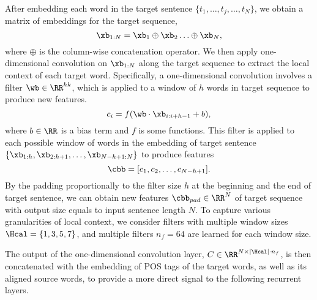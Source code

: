 \documentclass[11pt,a4paper]{article}
\newcommand{\wc}[1]{\textcolor{red}{\bf\small [#1 --WC]}}
\begin{document}
After embedding each word in the target sentence $\{t_1, \ldots, t_j, \ldots, t_N\}$,
we obtain a matrix of embeddings for the target sequence,
\begin{equation*}
	\xb_{1:N} = \xb_1 \oplus \xb_2 \ldots \oplus \xb_N,
\end{equation*}
where $\oplus$ is the column-wise concatenation operator.
We then apply one-dimensional convolution \cite{kim2014convolutional,liu2017deep}
on $\xb_{1:N}$ along the target sequence to extract the local context of each target word.
Specifically, a one-dimensional convolution involves a filter $\wb \in \RR^{hk}$, which is applied
to a window of $h$ words in target sequence to produce new features. 
\begin{equation*}
	c_i = f(\wb \cdot \xb_{i:i+h-1} + b),
\end{equation*}
where $b \in \RR$ is a bias term and $f$ is some functions. This filter is applied to each
possible window of words in the embedding of target sentence
$\{\xb_{1:h}, \xb_{2:h+1}, \ldots, \xb_{N-h+1:N} \}$ to produce features
\begin{equation*}
	\cbb = [c_1, c_2, \ldots, c_{N-h+1}].
\end{equation*}
By the padding proportionally to the filter size $h$
at the beginning and the end of target sentence, we can obtain
new features $\cbb_{pad} \in \RR^{N}$ of target sequence with output size equals to input sentence length $N$.
To capture various granularities of local context, we consider filters with multiple window sizes $\Hcal=\{1, 3, 5, 7\}$,
and multiple filters $n_f=64$ are learned for each window size.

The output of the one-dimensional convolution layer, $C \in \RR^{N \times |\Hcal| \cdot n_f}$,
is then concatenated with the embedding of POS tags of the target words, as well as its aligned source words,
to provide a more direct signal to the following recurrent layers.

\end{document}
